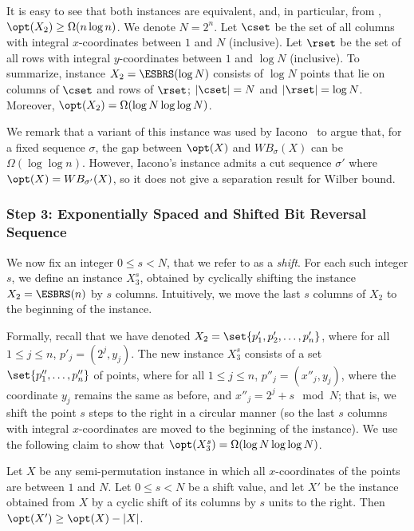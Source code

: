 It is easy to see that both instances are equivalent, and, in particular, from , $\opt(X_2)\geq \Omega(n\log n)$.
We denote $N=2^n$. Let $\cset$ be the set of all columns with integral $x$-coordinates between $1$ and $N$ (inclusive). Let $\rset$ be the set of all rows with integral $y$-coordinates between $1$ and $\log N$ (inclusive).
 To summarize, instance $X_2=\ESBRS(\log N)$ consists of $\log N$ points that lie on columns of $\cset$ and rows of $\rset$; $|\cset|= N$ and $|\rset|=\log N$. Moreover, $\opt(X_2)=\Omega(\log N\log\log N)$.


We remark that a variant of this instance was used by Iacono~\cite{in_pursuit} to argue that, for a fixed sequence $\sigma$, the gap between $\opt(X)$ and $WB_{\sigma}(X)$ can be $\Omega(\log \log n)$. 
However, Iacono's instance admits a cut sequence $\sigma'$ where $\opt(X) = WB_{\sigma'}(X)$, so it does not give a separation result for Wilber bound.    


%
%
%
\subsubsection{Step 3: Exponentially Spaced and Shifted Bit Reversal Sequence}
%
%
%
%
We now fix an integer $0\leq s< N$, that we refer to as a \emph{shift}. For each such integer $s$, we define an instance $X^s_3$, obtained by cyclically shifting the instance $X_2=\ESBRS(n)$ by $s$ columns. Intuitively, we move the last $s$ columns of $X_2$ to the beginning of the instance. 

Formally, recall that we have denoted $X_2=\set{p'_1,p'_2,\ldots,p'_{n}}$, where for all $1\leq j\leq n$, 
$p'_j=(2^j,y_j)$. The new instance $X_3^s$ consists of a set $\set{p''_1,\ldots,p''_n}$ of points, where for  all $1\leq j\leq n$, $p''_j=(x''_j,y_j)$, where the coordinate $y_j$ remains the same as before, and $x''_j=2^j+s\mod N$; that is, we shift the point $s$ steps to the right in a circular manner (so the last $s$ columns with integral $x$-coordinates are moved to the beginning of the instance). 
We use the following claim to show that $\opt(X_3^s)=\Omega(\log N\log\log N)$.

\begin{claim}\label{claim: shifting does not hurt opt}
	Let $X$ be any semi-permutation instance in which all $x$-coordinates of the points are between $1$ and $N$. Let $0\leq s<N$ be a shift value, and let $X'$ be the instance obtained from $X$ by a cyclic shift of its columns by $s$ units to the right.  
Then $\opt(X')\geq \opt(X)-|X|$.
\end{claim}


